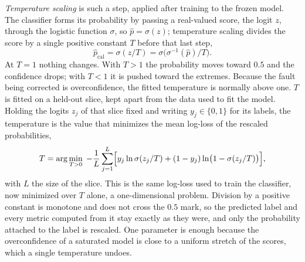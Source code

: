         \emph{Temperature scaling} is such a step, applied after training to the
        frozen model. The classifier forms its probability by passing a real-valued score, the
        logit $z$, through the logistic function $\sigma$, so $\hat{p} = \sigma(z)$;
        temperature scaling divides the score by a single positive constant $T$ before
        that last step,
        \begin{equation}
            \hat{p}_{\mathrm{cal}} = \sigma\!\left( z / T \right)
            = \sigma\!\bigl( \sigma^{-1}(\hat{p}) / T \bigr) .
            \label{eq:bg:unc:temp}
        \end{equation}
        At $T = 1$ nothing changes. With $T > 1$ the probability moves toward $0.5$ and
        the confidence drops; with $T < 1$ it is pushed toward the extremes. Because
        the fault being corrected is overconfidence, the fitted temperature is normally
        above one. $T$ is fitted on a held-out slice, kept apart from the data used to
        fit the model. Holding the logits $z_j$ of that slice fixed and writing
        $y_j \in \{0, 1\}$ for its labels, the temperature is the value that minimizes
        the mean log-loss of the rescaled probabilities,
        \begin{equation}
            T = \arg\min_{T > 0} \; -\frac{1}{L} \sum_{j=1}^{L}
            \Bigl[ y_j \ln \sigma(z_j / T)
            + (1 - y_j) \ln\bigl( 1 - \sigma(z_j / T) \bigr) \Bigr] ,
            \label{eq:bg:unc:tempfit}
        \end{equation}
        with $L$ the size of the slice. This is the same log-loss used to train the
        classifier, now minimized over $T$ alone, a one-dimensional problem.
        Division by a positive constant is monotone and does not cross the $0.5$
        mark, so the predicted label and every metric computed from it stay exactly
        as they were, and only the probability attached to the label is rescaled.
        One parameter is enough because
        the overconfidence of a saturated model is close to a uniform stretch of the
        scores, which a single temperature undoes.
    
